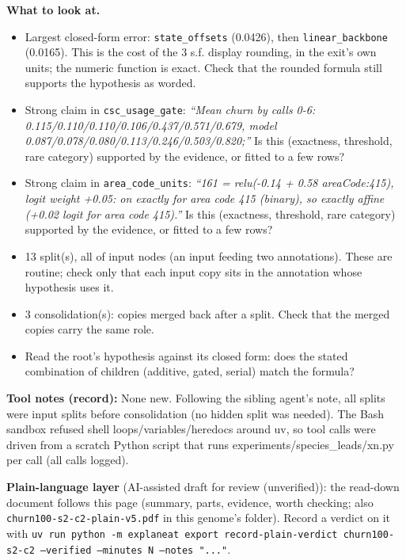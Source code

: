\documentclass[a4paper,11pt]{article}
\begin{document}
\textbf{What to look at.}
\begin{itemize}
\item Largest closed-form error: \texttt{state\_\allowbreak{}offsets} (0.0426), then \texttt{linear\_\allowbreak{}backbone} (0.0165). This is the cost of the 3 s.f. display rounding, in the exit's own units; the numeric function is exact. Check that the rounded formula still supports the hypothesis as worded.
\item Strong claim in \texttt{csc\_\allowbreak{}usage\_\allowbreak{}gate}: \emph{``Mean churn by calls 0-6: 0.115/\allowbreak{}0.110/\allowbreak{}0.110/\allowbreak{}0.106/\allowbreak{}0.437/\allowbreak{}0.571/\allowbreak{}0.679,\allowbreak{} model 0.087/\allowbreak{}0.078/\allowbreak{}0.080/\allowbreak{}0.113/\allowbreak{}0.246/\allowbreak{}0.503/\allowbreak{}0.820;\allowbreak{}''} Is this (exactness, threshold, rare category) supported by the evidence, or fitted to a few rows?
\item Strong claim in \texttt{area\_\allowbreak{}code\_\allowbreak{}units}: \emph{``161 = relu(-0.14 + 0.58 areaCode:415), logit weight +0.05: on exactly for area code 415 (binary), so exactly affine (+0.02 logit for area code 415).''} Is this (exactness, threshold, rare category) supported by the evidence, or fitted to a few rows?
\item 13 split(s), all of input nodes (an input feeding two annotations). These are routine; check only that each input copy sits in the annotation whose hypothesis uses it.
\item 3 consolidation(s): copies merged back after a split. Check that the merged copies carry the same role.
\item Read the root's hypothesis against its closed form: does the stated combination of children (additive, gated, serial) match the formula?
\end{itemize}
\textbf{Tool notes (record):} None new. Following the sibling agent's note, all splits were input splits before consolidation (no hidden split was needed). The Bash sandbox refused shell loops/\allowbreak{}variables/\allowbreak{}heredocs around uv, so tool calls were driven from a scratch Python script that runs experiments/\allowbreak{}species\_\allowbreak{}leads/\allowbreak{}xn.py per call (all calls logged).

\textbf{Plain-language layer} (AI-assisted draft for review (unverified)): the read-down document follows this page (summary, parts, evidence, worth checking; also \texttt{churn100-s2-c2-plain-v5.pdf} in this genome's folder). Record a verdict on it with \texttt{uv run python -m explaneat export record-plain-verdict churn100-s2-c2 --verified --minutes N --notes "..."}.
\end{document}
